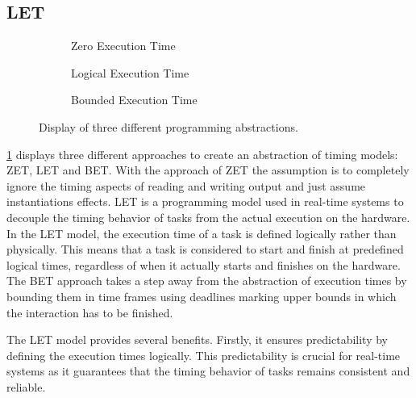 \subsection{\ac{LET}}\label{sec:let}

\begin{figure}[ht]
	\begin{subfigure}[c]{0.32\textwidth}
		\resizebox{\textwidth}{!}{%
			\label{fig:model_ZET}
			
		}
		\caption{Zero Execution Time}
	\end{subfigure}
	\hfill
	\begin{subfigure}[c]{0.32\textwidth}
		\resizebox{\textwidth}{!}{%
			\label{fig:model_LET}
			
			}
		\caption{Logical Execution Time}
	\end{subfigure}
	\hfill
	\begin{subfigure}[c]{0.32\textwidth}
		\resizebox{\textwidth}{!}{%
			\label{fig:model_BET}
			
		}
		\caption{Bounded Execution Time}
	\end{subfigure}
	\caption{Display of three different programming abstractions\cite{chakrabortyAdvancesRealTimeSystems2012}.}
	\label{fig:model_ZET_LET_BET}
\end{figure}
\cref{fig:model_ZET_LET_BET} displays three different approaches to create an abstraction of timing models: \ac{ZET}, \ac{LET} and \ac{BET}.
With the approach of \ac{ZET} the assumption is to completely ignore the timing aspects of reading and writing output and just assume instantiations effects\cite{chakrabortyAdvancesRealTimeSystems2012}.
\ac{LET} is a programming model used in real-time systems to decouple the timing behavior of tasks from the actual execution on the hardware. In the \ac{LET} model, the execution time of a task is defined logically rather than physically. This means that a task is considered to start and finish at predefined logical times, regardless of when it actually starts and finishes on the hardware\cite{chakrabortyAdvancesRealTimeSystems2012}.
The \ac{BET} approach takes a step away from the abstraction of execution times by bounding them in time frames using deadlines marking upper bounds in which the interaction has to be finished\cite{chakrabortyAdvancesRealTimeSystems2012}.

The \ac{LET} model provides several benefits. Firstly, it ensures predictability by defining the execution times logically. This predictability is crucial for real-time systems as it guarantees that the timing behavior of tasks remains consistent and reliable.

